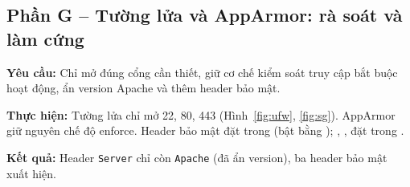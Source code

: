 \subsection{Phần G -- Tường lửa và AppArmor: rà soát và làm cứng}
\textbf{\large Yêu cầu:} Chỉ mở đúng cổng cần thiết, giữ cơ chế kiểm soát truy
cập bắt buộc hoạt động, ẩn version Apache và thêm header bảo mật.

\textbf{\large Thực hiện:} Tường lửa chỉ mở 22, 80, 443 (Hình~\ref{fig:ufw},
\ref{fig:sg}). AppArmor giữ nguyên chế độ enforce. Header bảo mật đặt trong
 (bật bằng ); ,
,  đặt trong .


\textbf{\large Kết quả:} Header \texttt{Server} chỉ còn \texttt{Apache} (đã ẩn
version), ba header bảo mật xuất hiện.
